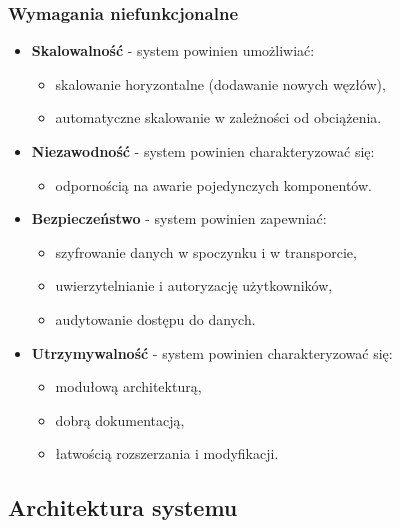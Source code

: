 \subsubsection{Wymagania niefunkcjonalne}
\label{subsubsec:wymagania_niefunkcjonalne}

\begin{itemize}
    
    \item \textbf{Skalowalność} - system powinien umożliwiać:
    \begin{itemize}
        \item skalowanie horyzontalne (dodawanie nowych węzłów),
        \item automatyczne skalowanie w zależności od obciążenia.
    \end{itemize}
    
    \item \textbf{Niezawodność} - system powinien charakteryzować się:
    \begin{itemize}
        \item odpornością na awarie pojedynczych komponentów.
    \end{itemize}
    
    \item \textbf{Bezpieczeństwo} - system powinien zapewniać:
    \begin{itemize}
        \item szyfrowanie danych w spoczynku i w transporcie,
        \item uwierzytelnianie i autoryzację użytkowników,
        \item audytowanie dostępu do danych.
    \end{itemize}
    
    \item \textbf{Utrzymywalność} - system powinien charakteryzować się:
    \begin{itemize}
        \item modułową architekturą,
        \item dobrą dokumentacją,
        \item łatwością rozszerzania i modyfikacji.
    \end{itemize}
\end{itemize}

\subsection{Architektura systemu}
\label{subsec:architektura}

